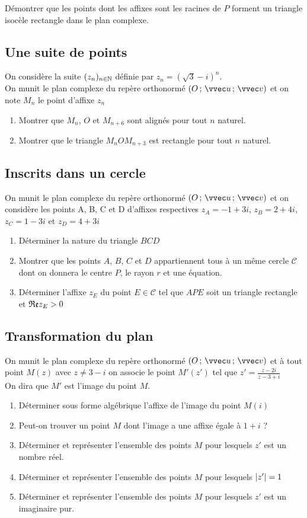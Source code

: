\documentclass[oneside,12pt]{book}          %
\begin{document}
Démontrer que les points dont les affixes sont les racines de $P$ forment un triangle isocèle rectangle dans le plan complexe.


\subsection{Une suite de points}

On considère la suite $(z_n)_{{n\in\mathbb N}}$ définie par $z_n=(\sqrt{3}-i)^n$. \\
On munit le plan complexe du repère orthonormé $\Ouv$ et on note $M_n$ le point d'affixe $z_n$
\begin{enumerate}
    \item Montrer que $M_n$, $O$ et $M_{n+6}$ sont alignés pour tout $n$ naturel.
    \item Montrer que le triangle $M_nOM_{n+3}$ est rectangle pour tout $n$ naturel.
\end{enumerate}



\subsection{Inscrits dans un cercle}
On munit le plan complexe du repère orthonormé $\Ouv$ et on considère les points A, B, C et D d'affixes respectives $z_A=-1+3i$, $z_B=2+4i$, $z_C=1-3i$ et $z_D=4+3i$

\begin{enumerate}
    \item Déterminer la nature du triangle $BCD$
    \item Montrer que les points $A$, $B$, $C$ et $D$ appartiennent tous à un même cercle $\mathscr{C}$ dont on donnera le centre $P$, le rayon $r$ et une équation.
    \item Déterminer l'affixe $z_E$ du point $E\in\mathscr{C}$ tel que $APE$ soit un triangle rectangle et ${\mathfrak{Re}}{z_E}>0$ 
\end{enumerate}



\subsection{Transformation du plan}
On munit le plan complexe du repère orthonormé $\Ouv$ et à tout point $M(z)$ avec $z\neq3-i$ on associe le point $M'(z')$ tel que $z'=\frac{z-2i}{z-3+i}$\\
On dira que $M'$ est l'image du point $M$.
\begin{enumerate}
	\item Déterminer sous forme algébrique l'affixe de l'image du point $M(i)$
	\item Peut-on trouver un point $M$ dont l'image a une affixe égale à $1+i$ ?
	\item Déterminer et représenter l'ensemble des points $M$ pour lesquels $z'$ est un nombre réel.
	\item Déterminer et représenter l'ensemble des points $M$ pour lesquels ${\left\lvert z' \right\rvert}=1$
	\item Déterminer et représenter l'ensemble des points $M$ pour lesquels $z'$ est un imaginaire pur.
\end{enumerate}
\end{document}
